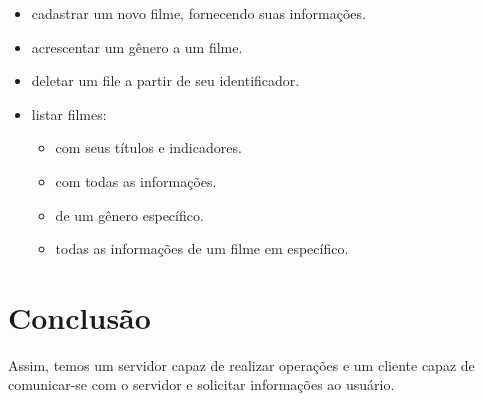 \documentclass[11pt]{article}
\theoremstyle{definition}
\theoremstyle{definition}
\theoremstyle{remark}
\theoremstyle{remark}
\theoremstyle{remark}
\theoremstyle{remark}
\theoremstyle{definition}
\begin{document}
\begin{itemize}
\item cadastrar um novo filme, fornecendo suas informações.
\item acrescentar um gênero a um filme.
\item deletar um file a partir de seu identificador.
\item listar filmes:
\begin{itemize}
\item com seus títulos e indicadores.
\item com todas as informações.
\item de um gênero específico.
\item todas as informações de um filme em específico.
\end{itemize}
\end{itemize}

\section*{Conclusão}
\label{sec:orgfdd2c13}
Assim, temos um servidor capaz de realizar operações e um cliente capaz de comunicar-se com o servidor e solicitar informações ao usuário.
\end{document}
